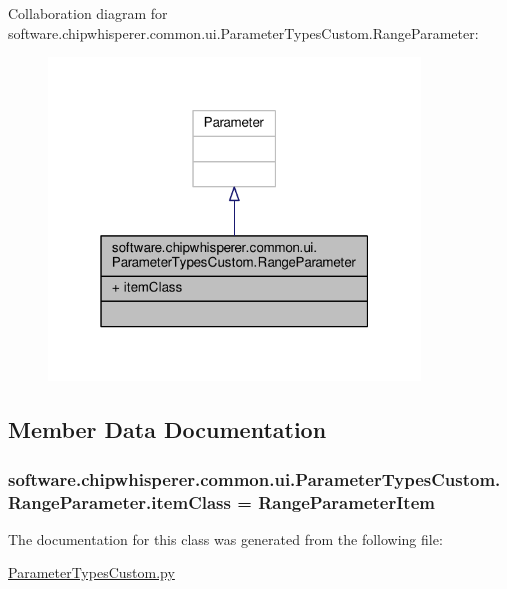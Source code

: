 Collaboration diagram for software.\+chipwhisperer.\+common.\+ui.\+Parameter\+Types\+Custom.\+Range\+Parameter\+:\nopagebreak
\begin{figure}[H]
\begin{center}
\leavevmode
\includegraphics[width=280pt]{d2/d64/classsoftware_1_1chipwhisperer_1_1common_1_1ui_1_1ParameterTypesCustom_1_1RangeParameter__coll__graph}
\end{center}
\end{figure}


\subsection{Member Data Documentation}
\hypertarget{classsoftware_1_1chipwhisperer_1_1common_1_1ui_1_1ParameterTypesCustom_1_1RangeParameter_af276fc176dae465a7651cc868e29ddc5}{}
\subsubsection[{item\+Class}]{\setlength{\rightskip}{0pt plus 5cm}software.\+chipwhisperer.\+common.\+ui.\+Parameter\+Types\+Custom.\+Range\+Parameter.\+item\+Class = {\bf Range\+Parameter\+Item}\hspace{0.3cm}{\ttfamily [static]}}\label{classsoftware_1_1chipwhisperer_1_1common_1_1ui_1_1ParameterTypesCustom_1_1RangeParameter_af276fc176dae465a7651cc868e29ddc5}


The documentation for this class was generated from the following file\+:\begin{DoxyCompactItemize}
\item 
\hyperlink{ParameterTypesCustom_8py}{Parameter\+Types\+Custom.\+py}\end{DoxyCompactItemize}
